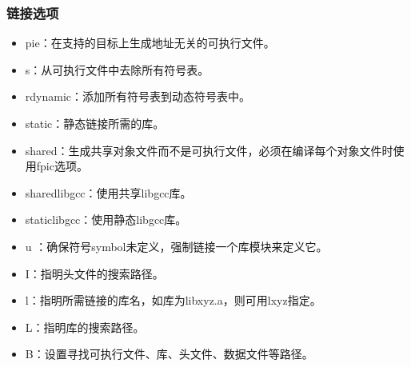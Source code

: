 \documentclass[a4paper,12pt,english]{sphinxmanual}
\begin{document}
\subsubsection{链接选项}
\label{\detokenize{compiler/gnu:id11}}\label{\detokenize{compiler/gnu:id12}}\begin{itemize}
\item {} 
\sphinxAtStartPar
\sphinxhyphen{}pie：在支持的目标上生成地址无关的可执行文件。

\item {} 
\sphinxAtStartPar
\sphinxhyphen{}s：从可执行文件中去除所有符号表。

\item {} 
\sphinxAtStartPar
\sphinxhyphen{}rdynamic：添加所有符号表到动态符号表中。

\item {} 
\sphinxAtStartPar
\sphinxhyphen{}static：静态链接所需的库。

\item {} 
\sphinxAtStartPar
\sphinxhyphen{}shared：生成共享对象文件而不是可执行文件，必须在编译每个对象文件时使用\sphinxhyphen{}fpic选项。

\item {} 
\sphinxAtStartPar
\sphinxhyphen{}shared\sphinxhyphen{}libgcc：使用共享libgcc库。

\item {} 
\sphinxAtStartPar
\sphinxhyphen{}static\sphinxhyphen{}libgcc：使用静态libgcc库。

\item {} 
\sphinxAtStartPar
\sphinxhyphen{}u ：确保符号symbol未定义，强制链接一个库模块来定义它。

\item {} 
\sphinxAtStartPar
\sphinxhyphen{}I：指明头文件的搜索路径。

\item {} 
\sphinxAtStartPar
\sphinxhyphen{}l：指明所需链接的库名，如库为libxyz.a，则可用\sphinxhyphen{}lxyz指定。

\item {} 
\sphinxAtStartPar
\sphinxhyphen{}L：指明库的搜索路径。

\item {} 
\sphinxAtStartPar
\sphinxhyphen{}B：设置寻找可执行文件、库、头文件、数据文件等路径。

\end{itemize}
\end{document}
